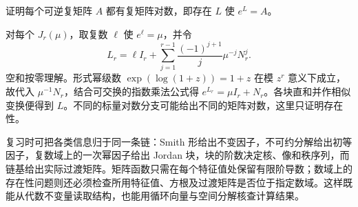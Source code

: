 \begin{example}
证明每个可逆复矩阵 $A$ 都有复矩阵对数，即存在 $L$ 使 $e^L=A$。
\end{example}
\begin{solve}
对每个 $J_r(\mu)$，取复数 $\ell$ 使 $e^{\ell}=\mu$，并令
\[
 L_r=\ell I_r+\sum_{j=1}^{r-1}\frac{(-1)^{j+1}}{j}\mu^{-j}N_r^j.
\]
空和按零理解。形式幂级数 $\exp(\log(1+z))=1+z$ 在模 $z^r$ 意义下成立，故代入 $\mu^{-1}N_r$，结合可交换的指数乘法公式得 $e^{L_r}=\mu I_r+N_r$。各块直和并作相似变换便得到 $L$。不同的标量对数分支可能给出不同的矩阵对数，这里只证明存在性。
\end{solve}

复习时可把各类信息归于同一条链：Smith 形给出不变因子，不可约分解给出初等因子，复数域上的一次幂因子给出 Jordan 块，块的阶数决定核、像和秩序列，而链基给出实际过渡矩阵。矩阵函数只需在每个特征值处保留有限阶导数；数域上的存在性问题则还必须检查所用特征值、方根及过渡矩阵是否位于指定数域。这样既能从代数不变量读取结构，也能用循环向量与空间分解核查计算结果。





